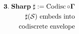 \documentclass[preview]{standalone}
\begin{document}
\begin{align*}
\special{dvisvgm:raw <g id='unique000'>}\mathbf{3.\;Sharp\;\sharp := \operatorname{Codisc}\circ\Gamma}\\\sharp(\mathcal{S})\text{ embeds into}\\\text{codiscrete envelope}\special{dvisvgm:raw </g>}
\end{align*}
\end{document}
